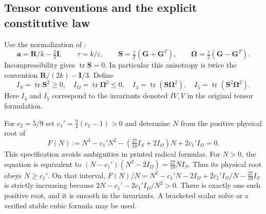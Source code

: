 \documentclass[11pt,a4paper]{article}
\numberwithin{equation}{section}
\newcommand{\eps}{\varepsilon}
\newcommand{\tr}{\operatorname{tr}}
\begin{document}
\subsection{Tensor conventions and the explicit constitutive law}
Use the normalization of \cite{WJ2000,Baungaard2022}:
\begin{equation}
 \bm a=\bm R/k-\tfrac23\bm I,\qquad \tau=k/\eps,\qquad
 \bm S=\tfrac{\tau}{2}(\bm G+\bm G^T),\qquad
 \bm\Omega=\tfrac{\tau}{2}(\bm G-\bm G^T).
 \label{eq:wj-normalization}
\end{equation}
Incompressibility gives $\tr\bm S=0$. In particular this anisotropy
is twice the convention $\bm R/(2k)-\bm I/3$.
Define
\begin{equation}
 I_S=\tr\bm S^2\geq0,\quad I_\Omega=\tr\bm\Omega^2\leq0,\quad
 I_4=\tr(\bm S\bm\Omega^2),\quad
 I_5=\tr(\bm S^2\bm\Omega^2).
 \label{eq:wj-invariants}
\end{equation}
Here $I_4$ and $I_5$ correspond to the invariants denoted $IV,V$
in the original tensor formulation.

For $c_2=5/9$ set $c_1'=\tfrac94(c_1-1)>0$ and determine $N$
from the positive physical root of
\begin{equation}
 F(N):=N^3-c_1'N^2-
       \left(\tfrac{27}{10}I_S+2I_\Omega\right)N
       +2c_1'I_\Omega=0.
 \label{eq:wj-cubic}
\end{equation}
This specification avoids ambiguities in printed radical formulas.
For $N>0$, the equation is equivalent to
$(N-c_1')(N^2-2I_\Omega)=\tfrac{27}{10}NI_S$.
Thus its physical root obeys $N\geq c_1'$. On that interval,
$F(N)/N=N^2-c_1'N-2I_\Omega+
2c_1'I_\Omega/N-\tfrac{27}{10}I_S$ is strictly increasing because
$2N-c_1'-2c_1'I_\Omega/N^2>0$.
There is exactly one such positive root, and it is smooth in the
invariants. A bracketed scalar solve or a verified stable cubic
formula may be used.
\end{document}
